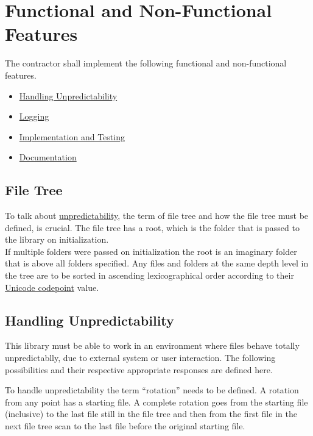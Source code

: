 \documentclass[11pt]{article} %
\begin{document}
    \section{Functional and Non-Functional Features}

    The contractor shall implement the following functional and non-functional features.
    \begin{itemize}
        \item[\ref{sec:3.1}] \hyperref[sec:3.1]{Handling Unpredictability}
        \item[\ref{sec:3.2}] \hyperref[sec:3.2]{Logging}
        \item[\ref{sec:3.3}] \hyperref[sec:3.3]{Implementation and Testing}
        \item[\ref{sec:3.4}] \hyperref[sec:3.4]{Documentation}
    \end{itemize}


    \subsection{File Tree}

    To talk about \hyperref[sec:3.1]{unpredictability}, the term of file tree and how the file tree must be defined, is crucial. The file tree has a root, which is the folder that is passed to the library on initialization.\\If multiple folders were passed on initialization the root is an imaginary folder that is above all folders specified. Any files and folders at the same depth level in the tree are to be sorted in ascending lexicographical order according to their \href{https://en.wikipedia.org/wiki/Code_point}{Unicode codepoint} value.


    \subsection{Handling Unpredictability}\label{sec:3.1}

    This library must be able to work in an environment where files behave totally unpredictablly, due to external system or user interaction. The following possibilities and their respective appropriate responses are defined here.

    To handle unpredictability the term ``rotation'' needs to be defined. A rotation from any point has a starting file. A complete rotation goes from the starting file (inclusive) to the last file still in the file tree and then from the first file in the next file tree scan to the last file before the original starting file.
\end{document}
